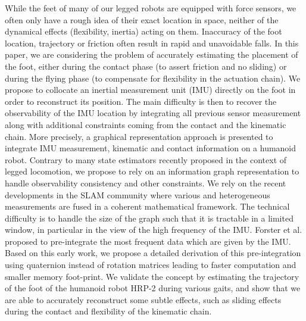 While the feet of many of our legged robots are equipped with force sensors, we often only have a rough idea of their exact location in space, neither of the dynamical effects (flexibility, inertia) acting on them.
Inaccuracy of the foot location, trajectory or friction often result in rapid and unavoidable falls.
In this paper, we are considering the problem of accurately estimating the placement of the foot, either during the contact phase (to assert friction and no sliding) or during the flying phase (to compensate for flexibility in the actuation chain).
We propose to collocate an inertial measurement unit (IMU) directly on the foot in order to reconstruct its position.
The main difficulty is then to recover the observability of the IMU location by integrating all previous sensor measurement along with additional constraints coming from the contact and the kinematic chain.
More precisely, a graphical representation approach is presented to integrate IMU measurement, kinematic and contact information on a humanoid robot. 
Contrary to many state estimators recently proposed in the context of legged locomotion, we propose to rely on an information graph representation to handle observability consistency and other constraints.
We rely on the recent developments in the SLAM community where various and heterogeneous measurements are fused in a coherent mathematical framework.
The technical difficulty is to handle the size of the graph such that it is tractable in a limited window, in particular in the view of the high frequency of the IMU.
Forster et al. proposed to pre-integrate the most frequent data which are given by the IMU.
Based on this early work, we propose a detailed derivation of this pre-integration using quaternion instead of rotation matrices leading to faster computation and smaller memory foot-print.
We validate the concept by estimating the trajectory of the foot of the humanoid robot HRP-2 during various gaits, and show that we are able to accurately reconstruct some subtle effects, such as sliding effects during the contact and flexibility of the kinematic chain.
